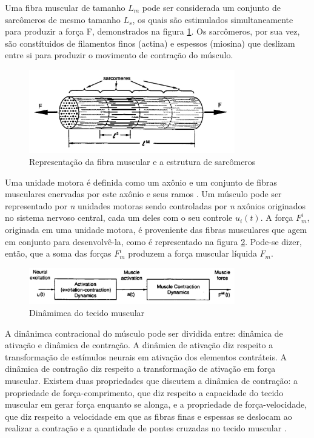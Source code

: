 Uma fibra muscular de tamanho $L_m$ pode ser considerada um conjunto de sarcômeros de mesmo tamanho $L_s$, os quais são estimulados simultaneamente para produzir a força F, demonstrados na figura \ref{sarcomeros}. Os sarcômeros, por sua vez, são constítuidos de filamentos finos (actina) e espessos (miosina) que deslizam entre si para produzir o movimento de contração do músculo.

\begin{figure}[H]
\centering
\includegraphics[width = 0.8\textwidth]{img/Zajac1989_Sarcomeros.JPG}
\caption[Representação dos Sarcômeros]{Representação da fibra muscular e a estrutura de sarcômeros \cite{zajac1989muscle}}
\label{sarcomeros}
\end{figure}

Uma unidade motora é definida como um axônio e um conjunto de fibras musculares enervadas por este axônio e seus ramos \cite{burke2011motor}. Um músculo pode ser representado por \textit{n} unidades motoras sendo controladas por \textit{n} axônios originados no sistema nervoso central, cada um deles com o seu controle $u_i(t)$. A força $F^i_m$, originada em uma unidade motora, é proveniente das fibras musculares que agem em conjunto para desenvolvê-la, como é representado na figura \ref{unidademotora}.  Pode-se dizer, então, que a soma das forças $F^i_m$ produzem a força muscular líquida $F_m$.

\begin{figure}[H]
\centering
\includegraphics[width = 0.8\textwidth]{img/Zajac1989_UnidadeMotora.JPG}
\caption[Representação da Produção de Força em uma Unidade Motora]{Dinâmimca do tecido muscular\cite{zajac1989muscle}}
\label{unidademotora}
\end{figure}

A dinânimca contracional do músculo pode ser dividida entre: dinâmica de ativação e dinâmica de contração. A dinâmica de ativação diz respeito a transformação de estímulos neurais em ativação dos elementos contráteis. A dinâmica de contração diz respeito a transformação de ativação em força muscular. Existem duas propriedades que discutem a dinâmica de contração: a propriedade de força-comprimento, que diz respeito a capacidade do tecido muscular em gerar força enquanto se alonga, e a propriedade de força-velocidade, que diz respeito a velocidade em que as fibras finas e espessas se deslocam ao realizar a contração e a quantidade de pontes cruzadas no tecido muscular \cite{zajac1989muscle}.

